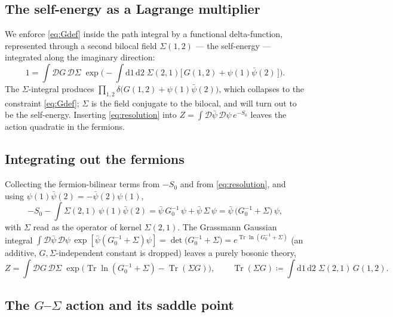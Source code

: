 \documentclass[11pt]{article}
\theoremstyle{remark}
\begin{document}
\subsection{The self-energy as a Lagrange multiplier}

We enforce \eqref{eq:Gdef} inside the path integral by a functional
delta-function, represented through a second bilocal field $\Sigma(1,2)$ --- the
self-energy --- integrated along the imaginary direction:
\begin{equation}
\label{eq:resolution}
1 = \int \mathcal{D}G\,\mathcal{D}\Sigma\;
\exp\!\Big(-\!\int \mathrm{d}1\,\mathrm{d}2\;\Sigma(2,1)\big[\,G(1,2)+\psi(1)\bar{\psi}(2)\,\big]\Big).
\end{equation}
The $\Sigma$-integral produces $\prod_{1,2}\delta\!\big(G(1,2)+\psi(1)\bar{\psi}(2)\big)$,
which collapses to the constraint \eqref{eq:Gdef}; $\Sigma$ is the field conjugate
to the bilocal, and will turn out to be the self-energy. Inserting
\eqref{eq:resolution} into $Z=\int\mathcal{D}\bar{\psi}\,\mathcal{D}\psi\,e^{-S_0}$
leaves the action quadratic in the fermions.

\subsection{Integrating out the fermions}

Collecting the fermion-bilinear terms from $-S_0$ and from
\eqref{eq:resolution}, and using $\psi(1)\bar{\psi}(2)=-\bar{\psi}(2)\psi(1)$,
\begin{equation}
-S_0 - \int \Sigma(2,1)\,\psi(1)\bar{\psi}(2)
= \bar{\psi}\,G_0^{-1}\,\psi + \bar{\psi}\,\Sigma\,\psi
= \bar{\psi}\,\big(G_0^{-1}+\Sigma\big)\,\psi,
\end{equation}
with $\Sigma$ read as the operator of kernel $\Sigma(2,1)$. The Grassmann
Gaussian integral $\int \mathcal{D}\bar{\psi}\,\mathcal{D}\psi\,
\exp[\bar{\psi}(G_0^{-1}+\Sigma)\psi] = \det\!\big(G_0^{-1}+\Sigma\big)
= e^{\operatorname{Tr}\ln(G_0^{-1}+\Sigma)}$ (an additive, $G,\Sigma$-independent constant is
dropped) leaves a purely bosonic theory,
\begin{equation}
Z = \int \mathcal{D}G\,\mathcal{D}\Sigma\;
\exp\!\big(\operatorname{Tr}\ln(G_0^{-1}+\Sigma) - \operatorname{Tr}(\Sigma G)\big),
\qquad
\operatorname{Tr}(\Sigma G)\coloneqq \int \mathrm{d}1\,\mathrm{d}2\;\Sigma(2,1)\,G(1,2).
\end{equation}

\subsection{The \texorpdfstring{$G$--$\Sigma$}{G-Sigma} action and its saddle point}
\end{document}
